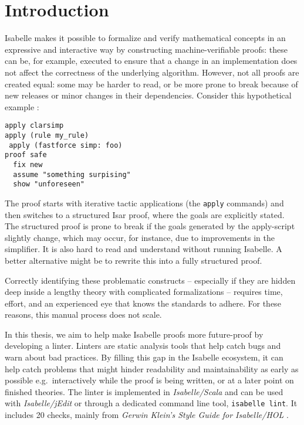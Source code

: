 \chapter{Introduction}\label{chapter:introduction}

Isabelle makes it possible to formalize and verify mathematical concepts in an
expressive and interactive way by constructing machine-verifiable proofs: these can
be, for example, executed to ensure that a change in an implementation does not
affect the correctness of the underlying algorithm.
However, not all proofs are created equal: some may be harder to read,
or be more prone to break because of new releases or minor changes
in their dependencies.
Consider this hypothetical example \cite{klein_2015}:
\begin{lstlisting}
apply clarsimp
apply (rule my_rule)
 apply (fastforce simp: foo)
proof safe
  fix new
  assume "something surpising"
  show "unforeseen"
\end{lstlisting}
The proof starts with iterative tactic applications (the \texttt{apply} commands) and then switches
to a structured Isar proof, where the goals are explicitly stated.
The structured proof is prone to break if the goals generated by the apply-script
slightly change, which may occur, for instance, due to improvements in the
simplifier. It is also hard to read and understand without running 
Isabelle. A better alternative might be to rewrite this into a fully structured 
proof.

Correctly identifying these problematic constructs -- especially if they are hidden
deep inside a lengthy theory with complicated formalizations -- requires time, 
effort, and an experienced eye that knows the standards to adhere. For these reasons, 
this manual process does not scale.

In this thesis, we aim to help make Isabelle proofs more future-proof by developing a 
linter. Linters are static analysis tools that help catch bugs and warn about bad
practices.
By filling this gap in the Isabelle ecosystem, it can help catch
problems that might hinder readability and maintainability as early as possible e.g.\ 
interactively while the proof is being written, or at a later point on finished theories.
The linter is implemented in \textit{Isabelle/Scala} and
can be used with \textit{Isabelle/jEdit} or through a dedicated command line 
tool,
\texttt{isabelle lint}. It includes 20 checks, mainly from 
\textit{Gerwin Klein's Style Guide for Isabelle/HOL} \cite{klein_2015,klein_2015_2}.

